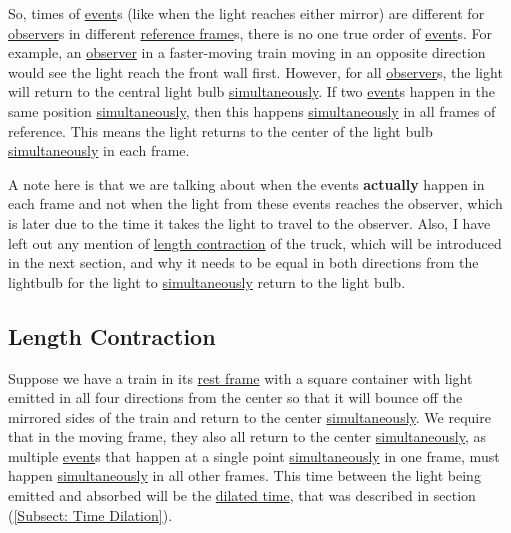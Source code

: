 So, times of \hyperlink{def-event}{event}s (like when the light reaches either mirror) are different for \hyperlink{def-observer}{observer}s in different \hyperlink{def-Reference-frame}{reference frame}s, there is no one true order of \hyperlink{def-event}{event}s.
For example, an \hyperlink{def-observer}{observer} in a faster-moving train moving in an opposite direction would see the light reach the front wall first.
However, for all \hyperlink{def-observer}{observer}s, the light will return to the central light bulb \hyperlink{def-simultaneity}{simultaneously}.
If two \hyperlink{def-event}{event}s happen in the same position \hyperlink{def-simultaneity}{simultaneously}, then this happens \hyperlink{def-simultaneity}{simultaneously} in all frames of reference.
This means the light returns to the center of the light bulb \hyperlink{def-simultaneity}{simultaneously} in each frame.

A note here is that we are talking about when the events \textbf{actually} happen in each frame and not when the light from these events reaches the observer, which is later due to the time it takes the light to travel to the observer.
Also, I have left out any mention of \hyperlink{def-length-contraction}{length contraction} of the truck, which will be introduced in the next section, and why it needs to be equal in both directions from the lightbulb for the light to \hyperlink{def-simultaneity}{simultaneously} return to the light bulb.

\subsection{Length Contraction}\label{sect: Length Contraction}

Suppose we have a train in its \hyperlink{def-proper-frame}{rest frame} with a square container with light emitted in all four directions from the center so that it will bounce off the mirrored sides of the train and return to the center \hyperlink{def-simultaneity}{simultaneously}.
We require that in the moving frame, they also all return to the center \hyperlink{def-simultaneity}{simultaneously}, as multiple \hyperlink{def-event}{event}s that happen at a single point \hyperlink{def-simultaneity}{simultaneously} in one frame, must happen \hyperlink{def-simultaneity}{simultaneously} in all other frames.
This time between the light being emitted and absorbed will be the \hyperlink{def-time-dilation}{dilated time}, that was described in section (\ref{Subsect: Time Dilation}).

